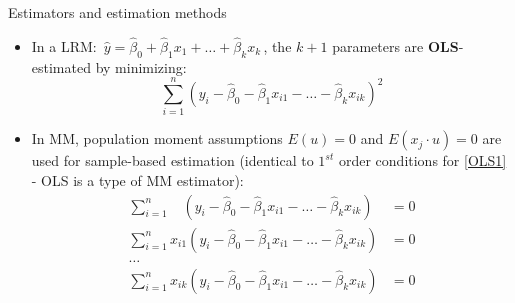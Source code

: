 \documentclass{beamer}
\begin{document}
\begin{frame}{Estimators and estimation methods}
\begin{itemize}
\item In a LRM: $\, \hat{y} = \hat{\beta}_0 + \hat{\beta}_1 x_{1} + \dots + \hat{\beta}_k x_{k} \,$, the $k+1$ parameters are \textbf{OLS}-estimated by minimizing:
\footnotesize{
\begin{equation} \label{OLS1}
\sum_{i=1}^n \left( y_i - \hat{\beta}_0 - \hat{\beta}_1 x_{i1} - \dots - \hat{\beta}_k x_{ik} \right)^2
\end{equation}
} %
\item In MM, population moment assumptions $E(u)=0$ and $E(x_j \cdot u)=0$ are used for sample-based estimation (identical to $1^{st}$ order conditions for \eqref{OLS1} - OLS is a type of MM estimator):
\footnotesize{
\begin{equation*}
\begin{aligned}
\sum_{i=1}^n ~~~~\left( y_i - \hat{\beta}_0 - \hat{\beta}_1 x_{i1} - \dots - \hat{\beta}_k x_{ik} \right) &= 0\\
\sum_{i=1}^n  x_{i1} \left( y_i - \hat{\beta}_0 - \hat{\beta}_1 x_{i1} - \dots - \hat{\beta}_k x_{ik} \right) &= 0\\
\dots &\\
\sum_{i=1}^n x_{ik} \left( y_i - \hat{\beta}_0 - \hat{\beta}_1 x_{i1} - \dots - \hat{\beta}_k x_{ik} \right) &= 0\\
\end{aligned}
\end{equation*}
} %
\end{itemize}
\end{frame}
\end{document}
